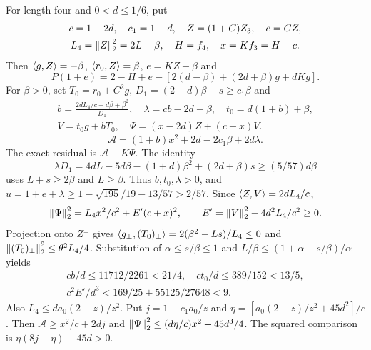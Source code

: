 For length four and $0<d\le1/6$, put
\[
 \begin{gathered}
 c=1-2d,\quad c_1=1-d,\quad Z=(1+C)Z_3,\quad e=CZ,\\
 L_4=\left\lVert Z\right\rVert_2^2=2L-\beta,\quad H=f_4,\quad x=Kf_3=H-c.
 \end{gathered}
\]
Then $\left\langle g,Z\right\rangle=-\beta$, $\left\langle r_0,Z\right\rangle=\beta$, $e=KZ-\beta$ and
\[
 P(1+e)=2-H+e-[2(d-\beta)+(2d+\beta)g+dKg].
\]
For $\beta>0$, set $T_0={r_0}+C^2g$, $D_1=(2-d)\beta-s\ge c_1\beta$ and
\[
 \begin{gathered}
 b=\frac{2dL_4/c+d\beta+\beta^2}{D_1},\quad
 \lambda=cb-2d-\beta,\quad t_0=d(1+b)+\beta,\\
 V=t_0g+bT_0,\quad \Psi=(x-2d)Z+(c+x)V.
 \end{gathered}
\]
\[
 \mathcal A=(1+b)x^2+2d-2c_1\beta+2d\lambda.
\]
The exact residual is $\mathcal A-K\Psi$. The identity
\[
 \lambda D_1=4dL-5d\beta-(1+d)\beta^2+(2d+\beta)s
 \ge(5/57)d\beta
\]
uses $L+s\ge2\beta$ and $L\ge\beta$. Thus $b,t_0,\lambda>0$, and
$u=1+e+\lambda\ge1-\sqrt{195}/19-13/57>2/57$.
Since $\left\langle Z,V\right\rangle=2dL_4/c$,
\[
 \left\lVert\Psi\right\rVert_2^2=L_4x^2/c^2+E'(c+x)^2,\qquad
 E'=\left\lVert V\right\rVert_2^2-4d^2L_4/c^2\ge0.
\]
Projection onto $Z^\perp$ gives
$\left\langle g_\perp,(T_0)_\perp\right\rangle=2(\beta^2-Ls)/L_4\le0$ and
$\left\lVert(T_0)_\perp\right\rVert_2^2\le\theta^2L_4/4$. Substitution of
$\alpha\le s/\beta\le1$ and $L/\beta\le(1+\alpha-s/\beta)/\alpha$ yields
\[
 \begin{gathered}
 cb/d\le11712/2261<21/4,\quad ct_0/d\le389/152<13/5,\\
 c^2E'/d^3<169/25+55125/27648<9.
 \end{gathered}
\]
Also $L_4\le da_0(2-z)/z^2$. Put
$j=1-c_1a_0/z$ and $\eta=[a_0(2-z)/z^2+45d^2]/c$.
Then $\mathcal A\ge x^2/c+2dj$ and
$\left\lVert\Psi\right\rVert_2^2\le(d\eta/c)x^2+45d^3/4$.
The squared comparison is $\eta(8j-\eta)-45d>0$.

